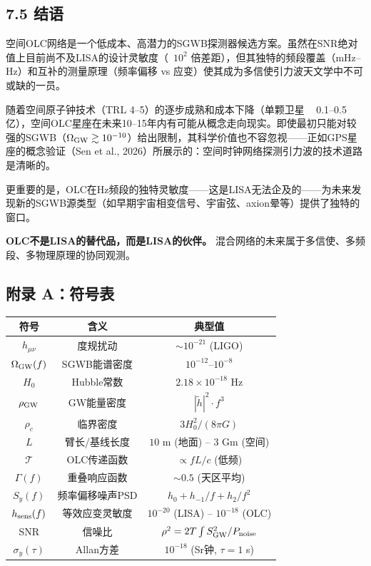 \documentclass[12pt,a4paper]{article}
\begin{document}
\subsection{7.5 结语}


空间OLC网络是一个低成本、高潜力的SGWB探测器候选方案。虽然在SNR绝对值上目前尚不及LISA的设计灵敏度（~$10^2$ 倍差距），但其独特的频段覆盖（mHz–Hz）和互补的测量原理（频率偏移 vs 应变）使其成为多信使引力波天文学中不可或缺的一员。

随着空间原子钟技术（TRL 4–5）的逐步成熟和成本下降（单颗卫星 ~ 0.1–0.5亿），空间OLC星座在未来10–15年内有可能从概念走向现实。即使最初只能对较强的SGWB（$\Omega_{\rm GW} \gtrsim 10^{-10}$）给出限制，其科学价值也不容忽视——正如GPS星座的概念验证（Sen et al., 2026）所展示的：空间时钟网络探测引力波的技术道路是清晰的。

更重要的是，OLC在Hz频段的独特灵敏度——这是LISA无法企及的——为未来发现新的SGWB源类型（如早期宇宙相变信号、宇宙弦、axion晕等）提供了独特的窗口。

\textbf{OLC不是LISA的替代品，而是LISA的伙伴。} 混合网络的未来属于多信使、多频段、多物理原理的协同观测。


\subsection{附录 A：符号表}


\begin{tabular}{|c|c|c|}
\hline
符号 & 含义 & 典型值 \\
\hline
$h_{\mu\nu}$ & 度规扰动 & $\sim 10^{-21}$ (LIGO) \\
$\Omega_{\rm GW}(f)$ & SGWB能谱密度 & $10^{-12}$–$10^{-8}$ \\
$H_0$ & Hubble常数 & $2.18 \times 10^{-18}$ Hz \\
$\rho_{\rm GW}$ & GW能量密度 & $|\tilde{h}|^2 \cdot f^3$ \\
$\rho_c$ & 临界密度 & $3H_0^2/(8\pi G)$ \\
$L$ & 臂长/基线长度 & $10$ m (地面) – $3$ Gm (空间) \\
$\mathcal{T}$ & OLC传递函数 & $\propto fL/c$ (低频) \\
$\Gamma(f)$ & 重叠响应函数 & $\sim 0.5$ (天区平均) \\
$S_y(f)$ & 频率偏移噪声PSD & $h_0 + h_{-1}/f + h_2/f^2$ \\
$h_{\rm sens}(f)$ & 等效应变灵敏度 & $10^{-20}$ (LISA) – $10^{-18}$ (OLC) \\
SNR & 信噪比 & $\rho^2 = 2T \int S_{\rm GW}^2/P_{\rm noise}$ \\
$\sigma_y(\tau)$ & Allan方差 & $10^{-18}$ (Sr钟, $\tau=1$ s) \\
\hline
\end{tabular}
\end{document}

